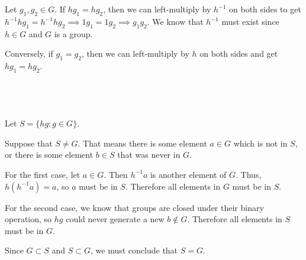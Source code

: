 \documentclass[a4paper]{article}
\begin{document}
\subsection{~}

Let $g_1, g_2 \in G$. If $h g_1 = h g_2$, then we can left-multiply by $h^{-1}$ on both sides to get $h^{-1} h g_1 = h^{-1} h g_2 \implies 1 g_1 = 1 g_2 \implies g_1 g_2$. We know that $h^{-1}$ must exist since $h \in G$ and $G$ is a group.

Conversely, if $g_1 = g_2$, then we can left-multiply by $h$ on both sides and get $h g_1 = h g_2$.

\subsection{~}

Let $S = \{hg : g \in G\}$.

Suppose that $S \ne G$. That means there is some element $a \in G$ which is not in $S$, or there is some element $b \in S$ that was never in $G$.

For the first case, let $a \in G$. Then $h^{-1} a$ is another element of $G$. Thus, $h \left( h^{-1} a \right) = a$, so $a$ must be in $S$. Therefore all elements in $G$ must be in $S$.

For the second case, we know that groups are closed under their binary operation, so $hg$ could never generate a new $b \notin G$. Therefore all elements in $S$ must be in $G$.

Since $G \subset S$ and $S \subset G$, we must conclude that $S = G$.
\end{document}
